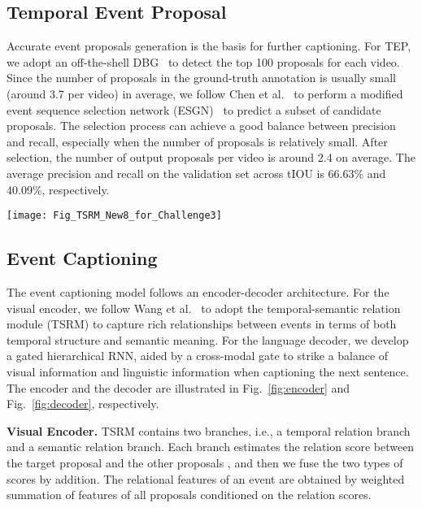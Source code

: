 \documentclass[10pt,twocolumn,letterpaper]{article}
\begin{document}
\subsection{Temporal Event Proposal}

Accurate event proposals generation is the basis for further captioning. For TEP, we adopt an off-the-shell DBG~\cite{lin2019fast} to detect the top 100 proposals for each video. Since the number of proposals in the ground-truth annotation is usually small (around 3.7 per video) in average, we follow Chen et al.~\cite{chen2019activitynet} to perform a modified event sequence selection network (ESGN)~\cite{Mun2019stream} to predict a subset of candidate proposals. The selection process can achieve a good balance between precision and recall, especially when the number of proposals is relatively small. After selection, the number of output proposals per video is around 2.4 on average. The average precision and recall on the validation set across tIOU is 66.63\% and 40.09\%, respectively.

\begin{figure*}
	\centering
	\texttt{[image: Fig\_TSRM\_New8\_for\_Challenge3]}
	\caption{The proposed Decoder.}
	\label{fig:decoder}
\end{figure*}

\subsection{Event Captioning}
The event captioning model follows an encoder-decoder architecture. For the visual encoder, we follow Wang et al.~\cite{wang2020} to adopt the temporal-semantic relation module (TSRM) to capture rich relationships between events in terms of both temporal structure and semantic meaning.  For the language decoder, we develop a gated hierarchical RNN, aided by a cross-modal gate to strike a balance of visual information and linguistic information when captioning the next sentence.  The encoder and the decoder are illustrated in Fig.~\ref{fig:encoder} and Fig.~\ref{fig:decoder}, respectively.

{\textbf{Visual Encoder.}} TSRM contains two branches, i.e., a temporal relation branch and a semantic relation branch. Each branch estimates the relation score between the target proposal  and the other proposals , and then we fuse the two types of scores by addition. The relational features of an event are obtained by weighted summation of features of all proposals conditioned on the relation scores.
\end{document}
